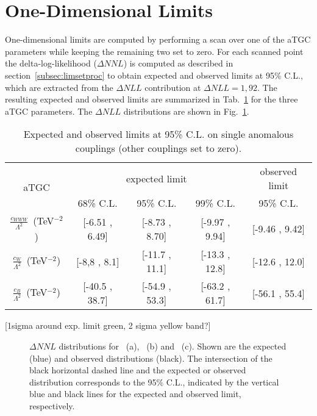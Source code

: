 \section{One-Dimensional Limits}
One-dimensional limits are computed by performing a scan over one of the aTGC parameters while keeping the remaining two set to zero. For each scanned point the delta-log-likelihood ($\Delta NNL$) is computed as described in section~\ref{subsec:limsetproc} to obtain expected and observed limits at 95\% C.L., which are extracted from the $\Delta NLL$ contribution at $\Delta NLL=1,92$. The resulting expected and observed limits are summarized in Tab.~\ref{tab:limits:1dlimits} for the three aTGC parameters. The $\Delta NLL$ distributions are shown in Fig.~\ref{fig:limits:1dlimits}.

\begin{table}
	\centering
	\caption[Expected and observed limits at 95\% C.L. on single anomalous couplings]{Expected and observed limits at 95\% C.L. on single anomalous couplings (other couplings set to zero).}
	\label{tab:limits:1dlimits}
	\begin{tabular}{ccccc}
	\hline
	\multirow{2}{*}{aTGC}              &     \multicolumn{3}{c}{expected limit} & observed limit\\
	& 68\% C.L. & 95\% C.L. & 99\% C.L. & 95\% C.L.\\
	\hline
	$\frac{c_{WWW}}{\Lambda ^2}$~(TeV$^{-2}$) & [-6.51 , 6.49] & [-8.73 , 8.70] & [-9.97 , 9.94] & [-9.46 , 9.42] \\
	$\frac{c_{W}}{\Lambda ^2}$~(TeV$^{-2}$)   & [-8,8 , 8.1] & [-11.7 , 11.1] & [-13.3 , 12.8] & [-12.6 , 12.0] \\
	$\frac{c_{B}}{\Lambda ^2}$~(TeV$^{-2}$)   & [-40.5 , 38.7] & [-54.9 , 53.3] & [-63.2 , 61.7] & [-56.1 , 55.4] \\
	\hline
	\end{tabular}
\end{table}


[1sigma around exp. limit green, 2 sigma yellow band?]
\begin{figure}
	\centering
	\caption[Delta-log-likelihood distributions for the three aTGC parameters]{$\Delta NNL$ distributions for \Tcwww \ (a), \Tccw \ (b) and \Tcb \ (c). Shown are the expected (blue) and observed distributions (black). The intersection of the black horizontal dashed line and the expected or observed distribution corresponds to the 95\% C.L., indicated by the vertical blue and black lines for the expected and observed limit, respectively.}
	\label{fig:limits:1dlimits}
\end{figure}

